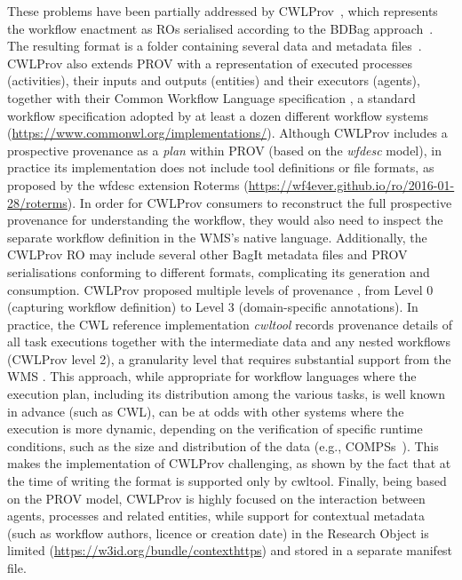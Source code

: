 \documentclass[10pt,letterpaper]{article}
\begin{document}
These problems have been partially addressed by CWLProv~\cite{Khan 2019}, which represents the workflow enactment as ROs serialised according to the BDBag approach~\cite{Chard 2016}.
The resulting format is a folder containing several data and metadata files~\cite{Soiland-Reyes 2018}.
CWLProv also extends PROV with a representation of executed processes (activities), their inputs and outputs (entities) and their executors (agents), together with their Common Workflow Language specification
\cite{Crusoe 2022}, a standard workflow specification adopted by at least a dozen different workflow systems (\url{https://www.commonwl.org/implementations/}). Although CWLProv includes a prospective provenance as a \emph{plan}
within PROV (based on the \emph{wfdesc} model), in practice its implementation does not include tool definitions or file formats, as proposed by the wfdesc extension Roterms (\url{https://wf4ever.github.io/ro/2016-01-28/roterms}).
In order for CWLProv consumers to reconstruct the full prospective provenance for understanding the workflow, they would also need to inspect the separate workflow definition in the WMS's native language.
Additionally, the CWLProv RO may include several other BagIt metadata files and PROV serialisations conforming to different formats, complicating its generation and consumption.
CWLProv proposed multiple levels of provenance \cite[figure 2]{Khan 2019}, from Level 0 (capturing workflow definition) to Level 3 (domain-specific annotations). 
In practice, the CWL reference implementation \emph{cwltool} \cite{Amstutz 2023} records provenance details of all task executions together with the intermediate data and any nested workflows (CWLProv level 2), a granularity level that requires substantial support from the WMS
\cite{Soiland-Reyes 2022a}.
This approach, while appropriate for workflow languages where the execution plan, including its distribution among the various tasks, is well known in advance (such as CWL), can be at odds with other systems where the execution is more dynamic, depending on the verification of specific runtime conditions, such as the size and distribution of the data (e.g., COMPSs~\cite{Lordan 2014}).
This makes the implementation of CWLProv challenging, as shown by the fact that at the time of writing the format is supported only by cwltool.
Finally, being based on the PROV model, CWLProv is highly focused on the interaction between agents, processes and related entities, while support for contextual metadata (such as workflow authors, licence or creation date) in the Research Object is limited (\url{https://w3id.org/bundle/contexthttps}) and stored in a separate manifest file.
\end{document}
